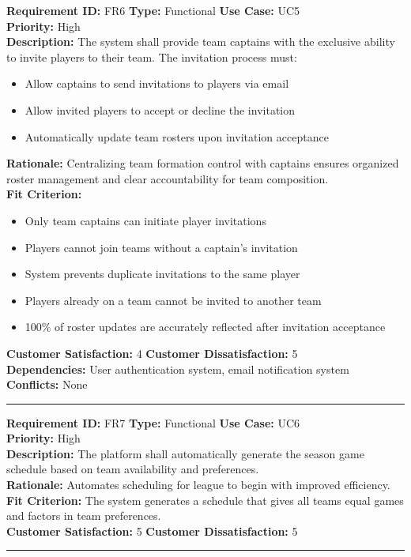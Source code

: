 \documentclass[12pt, titlepage]{article}
\begin{document}
\textbf{Requirement ID:} FR6 \quad \textbf{Type:} Functional \quad \textbf{Use Case:} UC5 \\
\textbf{Priority:} High \\
\textbf{Description:} The system shall provide team captains with the exclusive ability to invite players to their team. The invitation process must:
\begin{itemize}
    \item Allow captains to send invitations to players via email
    \item Allow invited players to accept or decline the invitation
    \item Automatically update team rosters upon invitation acceptance
\end{itemize}
\textbf{Rationale:} Centralizing team formation control with captains ensures organized roster management and clear accountability for team composition.\\
\textbf{Fit Criterion:} 
\begin{itemize}
    \item Only team captains can initiate player invitations
    \item Players cannot join teams without a captain's invitation
    \item System prevents duplicate invitations to the same player
    \item Players already on a team cannot be invited to another team
    \item 100\% of roster updates are accurately reflected after invitation acceptance
\end{itemize}
\textbf{Customer Satisfaction:} 4 \quad\quad \textbf{Customer Dissatisfaction:} 5\\
\textbf{Dependencies:} User authentication system, email notification system\\
\textbf{Conflicts:} None\\
\noindent\rule{\textwidth}{1pt}

\textbf{Requirement ID:} FR7 \quad \textbf{Type:} Functional \quad \textbf{Use Case:} UC6 \\
\textbf{Priority:} High \\
\textbf{Description:} The platform shall automatically generate the season game schedule based on team availability and preferences.\\
\textbf{Rationale:} Automates scheduling for league to begin with improved efficiency.\\
\textbf{Fit Criterion:} The system generates a schedule that gives all teams equal games and factors in team preferences.\\
\textbf{Customer Satisfaction:} 5 \quad\quad \textbf{Customer Dissatisfaction:} 5\\
\noindent\rule{\textwidth}{1pt}
\end{document}
